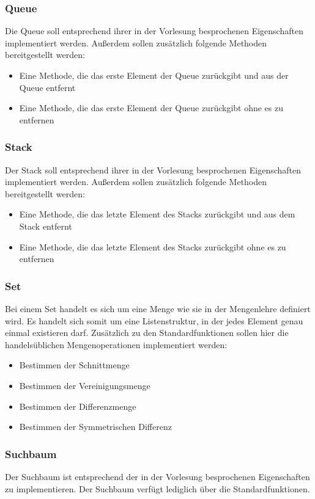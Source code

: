 \documentclass[a4paper,
			   fontsize=12pt]{article}
\begin{document}
\subsubsection*{Queue}
Die Queue soll entsprechend ihrer in der Vorlesung besprochenen Eigenschaften implementiert werden. Außerdem sollen zusätzlich folgende Methoden bereitgestellt werden:
\begin{itemize}
	\item Eine Methode, die das erste Element der Queue zurückgibt und aus der Queue entfernt
	\item Eine Methode, die das erste Element der Queue zurückgibt ohne es zu entfernen
\end{itemize}

\subsubsection*{Stack}
Der Stack soll entsprechend ihrer in der Vorlesung besprochenen Eigenschaften implementiert werden. Außerdem sollen zusätzlich folgende Methoden bereitgestellt werden:
\begin{itemize}
	\item Eine Methode, die das letzte Element des Stacks zurückgibt und aus dem Stack entfernt
	\item Eine Methode, die das letzte Element des Stacks zurückgibt ohne es zu entfernen
\end{itemize}

\subsubsection*{Set}
Bei einem Set handelt es sich um eine Menge wie sie in der Mengenlehre definiert wird. Es handelt sich somit um eine Listenstruktur, in der jedes Element genau einmal existieren darf. Zusätzlich zu den Standardfunktionen sollen hier
die handelsüblichen Mengenoperationen implementiert werden:
\begin{itemize}
	\item Bestimmen der Schnittmenge
	\item Bestimmen der Vereinigungsmenge
	\item Bestimmen der Differenzmenge
	\item Bestimmen der Symmetrischen Differenz
\end{itemize}

\subsubsection*{Suchbaum}
Der Suchbaum ist entsprechend der in der Vorlesung besprochenen Eigenschaften zu implementieren. Der Suchbaum verfügt lediglich über die Standardfunktionen.
\end{document}
